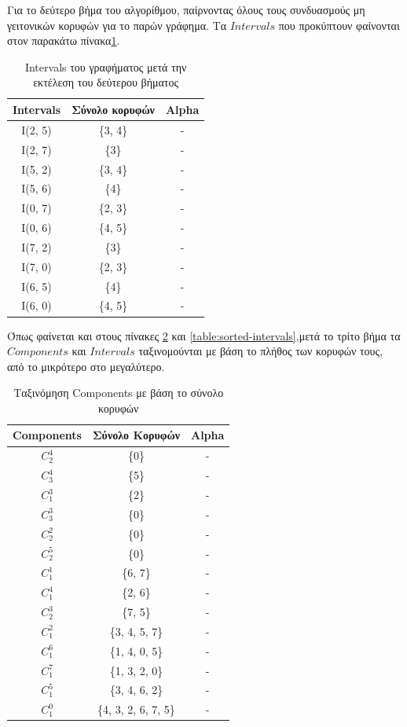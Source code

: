Για το δεύτερο βήμα του αλγορίθμου, παίρνοντας όλους τους συνδυασμούς μη γειτονικών κορυφών για το παρών γράφημα. Τα $Intervals$ που προκύπτουν φαίνονται στον παρακάτω πίνακα\ref{table:second-step-intependent-set}. 

\begin{table}[H]
	
	\centering
	\caption{Intervals του γραφήματος μετά την εκτέλεση του δεύτερου βήματος}
	\begin{tabular}{|c|c|c|}
		\hline
		\textbf{Intervals} & \textbf{Σύνολο κορυφών} & \textbf{Alpha} \\
		\hline
		I(2, 5) & \quad \{3, 4\} & - \\
		I(2, 7) & \quad \{3\} & - \\
		I(5, 2) & \quad \{3, 4\} & - \\
		I(5, 6) & \quad \{4\} & - \\
		I(0, 7) & \quad \{2, 3\} & - \\
		I(0, 6) & \quad \{4, 5\} & - \\
		I(7, 2) & \quad \{3\} & - \\
		I(7, 0) & \quad \{2, 3\} & - \\
		I(6, 5) & \quad \{4\} & - \\
		I(6, 0) & \quad \{4, 5\} & - \\
		\hline
	\end{tabular}
	\label{table:second-step-intependent-set}
\end{table}

Όπως φαίνεται και στους πίνακες \ref{table:sorted-components} και \ref{table:sorted-intervals},μετά το τρίτο βήμα τα $Components$ και $Intervals$ ταξινομούνται με βάση το πλήθος των κορυφών τους, από το μικρότερο στο μεγαλύτερο.

\begin{table}[H]
	\centering
	\caption{Ταξινόμηση Components με βάση το σύνολο κορυφών}
	\begin{tabular}{|c|c|c|}
		\hline
		\textbf{Components} & \textbf{Σύνολο Κορυφών} & \textbf{Alpha} \\
		\hline
		$C_2^4$ & \quad \{0\} & - \\
		$C_3^4$ & \quad \{5\} & - \\
		$C_1^3$ & \quad \{2\} & - \\
		$C_3^3$ & \quad \{0\} & - \\
		$C_2^2$ & \quad \{0\} & - \\
		$C_2^5$ & \quad \{0\} & - \\
		$C_1^1$ & \quad \{6, 7\} & - \\
		$C_1^4$ & \quad \{2, 6\} & - \\
		$C_2^3$ & \quad \{7, 5\} & - \\
		$C_1^2$ & \quad \{3, 4, 5, 7\} & - \\
		$C_1^6$ & \quad \{1, 4, 0, 5\} & - \\
		$C_1^7$ & \quad \{1, 3, 2, 0\} & - \\
		$C_1^5$ & \quad \{3, 4, 6, 2\} & - \\
		$C_1^0$ & \quad \{4, 3, 2, 6, 7, 5\} & - \\
		\hline
	\end{tabular}
	\label{table:sorted-components}
\end{table} 


